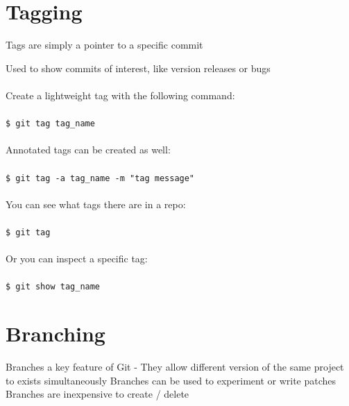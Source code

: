 \documentclass{beamer}
\begin{document}
\section{Tagging}
\begin{frame}[allowframebreaks]{\secname}
    Tags are simply a pointer to a specific commit

    Used to show commits of interest, like version releases or bugs \\~\\
    Create a lightweight tag with the following command: \\~\\
    {\tt \$ git tag tag\_name} \\~\\
    Annotated tags can be created as well:  \\~\\
    {\tt \$ git tag -a tag\_name -m "tag message"} \\~\\
\framebreak
    You can see what tags there are in a repo: \\~\\
    {\tt \$ git tag} \\~\\
    Or you can inspect a specific tag: \\~\\
    {\tt \$ git show tag\_name}
\end{frame}

\section{Branching}
\begin{frame}{\secname}
    Branches a key feature of Git - They allow different version of the same
    project to exists simultaneously
    Branches can be used to experiment or write patches
    Branches are inexpensive to create / delete
\end{frame}
\end{document}
